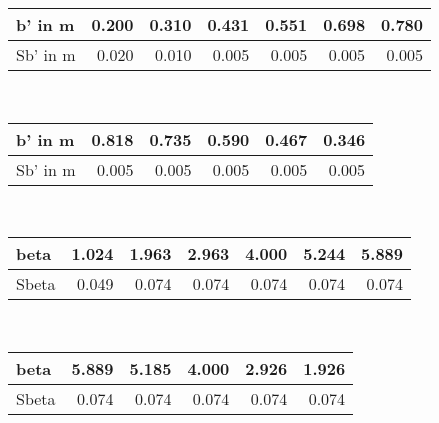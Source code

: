 	\begin{tabular}{| l | r|r|r|r|r|r|}
	\hline
        b' in m& 0.200 & 0.310 & 0.431 & 0.551 & 0.698 & 0.780 \\ \hline Sb' in m& 0.020 & 0.010 & 0.005 & 0.005 & 0.005 & 0.005 \\ \hline
	\end{tabular} \\ \vspace{3 mm} \normalsize \vspace{3 mm}
	\begin{tabular}{| l | r|r|r|r|r|}
	\hline
        b' in m& 0.818 & 0.735 & 0.590 & 0.467 & 0.346 \\ \hline Sb' in m& 0.005 & 0.005 & 0.005 & 0.005 & 0.005 \\ \hline
	\end{tabular} \\ \vspace{3 mm} \normalsize \vspace{3 mm}
	\begin{tabular}{| l | r|r|r|r|r|r|}
	\hline
        beta& 1.024 & 1.963 & 2.963 & 4.000 & 5.244 & 5.889 \\ \hline Sbeta& 0.049 & 0.074 & 0.074 & 0.074 & 0.074 & 0.074 \\ \hline
	\end{tabular} \\ \vspace{3 mm} \normalsize \vspace{3 mm}
	\begin{tabular}{| l | r|r|r|r|r|}
	\hline
        beta& 5.889 & 5.185 & 4.000 & 2.926 & 1.926 \\ \hline Sbeta& 0.074 & 0.074 & 0.074 & 0.074 & 0.074 \\ \hline
	\end{tabular} \\ 
